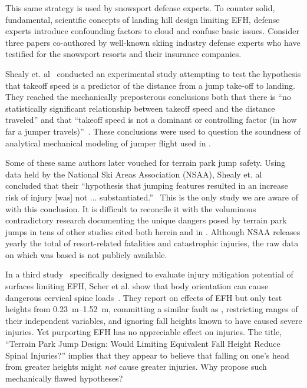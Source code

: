 \documentclass[smallextended]{svjour3}       %
\begin{document}
This same strategy is used by snowsport defense experts. To counter solid,
fundamental, scientific concepts of landing hill design limiting EFH, defense
experts introduce confounding factors to cloud and confuse basic issues.
Consider three papers \cite{Shealy2010,Shealy2015,Scher2015} co-authored by
well-known skiing industry defense experts who have testified for the snowsport
resorts and their insurance companies.

Shealy et. al~\cite{Shealy2010} conducted an experimental study attempting to
test the hypothesis that takeoff speed is a predictor of the distance from a
jump take-off to landing. They reached the mechanically preposterous
conclusions both that there is ``no statistically significant relationship
between takeoff speed and the distance traveled'' and that ``takeoff speed is
not a dominant or controlling factor (in how far a jumper
travels)''~\cite{Shealy2010}. These conclusions were used to question the
soundness of analytical mechanical modeling of jumper flight used in
\cite{Hubbard2009,McNeil2012}.

Some of these same authors later vouched for terrain park jump safety. Using data
held by the National Ski Areas Association (NSAA), Shealy et.
al~\cite{Shealy2015} concluded that their ``hypothesis that jumping features
resulted in an increase risk of injury [was] not ...
substantiated.''~\cite{Shealy2015} This is the only study we are aware of with
this conclusion. It is difficult to reconcile it with the
voluminous contradictory research documenting the unique dangers posed by terrain park jumps
in tens of other studies cited both herein and in
\cite{Hubbard2009,Swedberg2012,McNeil2012,McNeil2012a,Hubbard2015,Levy2015,Petrone2017,Moore2018}.
Although NSAA releases yearly the total of resort-related fatalities
and catastrophic injuries, the raw data on which \cite{Shealy2015} was based
is not publicly available.

In a third study~\cite{Scher2015} specifically designed to evaluate injury 
mitigation potential of surfaces limiting EFH, Scher et al. show that body 
orientation can cause dangerous cervical spine loads~\cite{Scher2015}. They
report on effects of EFH but only test heights from
\SIrange{0.23}{1.52}{\meter}, committing a similar fault as \cite{Shealy2010},
restricting ranges of their independent variables, and ignoring fall heights
known to have caused severe injuries. Yet purporting EFH has no appreciable
effect on injuries. The title, ``Terrain Park Jump Design: Would Limiting
Equivalent Fall Height Reduce Spinal Injuries?'' implies that they appear to
believe that falling on one's head from greater heights might \emph{not} cause
greater injuries. Why propose such mechanically flawed hypotheses?
\end{document}
